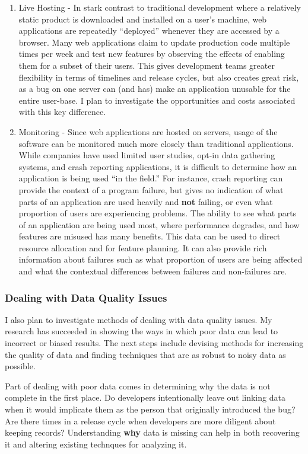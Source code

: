 \documentclass[10pt]{article}
\newcommand\Subsection[1]{\subsubsection*{\small #1}}
\begin{document}
\begin{small}
\begin{enumerate}

\item Live Hosting - 
    In stark contrast to traditional development where a relatively static
    product is downloaded and installed on a user's machine, web applications are repeatedly ``deployed''
    whenever they are accessed by a browser.  Many web applications 
    claim to update production code multiple times per week and 
    test new features by observing the effects of enabling them for a subset of their users. 
    This gives development teams greater flexibility in terms of timelines and release cycles, but
    also creates great risk, as a bug on one server can (and has) make an application unusable
    for the entire user-base.
    I plan to investigate the opportunities and costs associated with this key difference.

\item Monitoring - Since web applications are hosted on servers, usage of the software
    can be monitored much more closely than traditional applications.  While companies have used limited
    user studies, opt-in data gathering systems, and crash reporting applications, it is difficult
    to determine how an application is being used ``in the field.'' For instance, crash reporting
    can provide the context of a program failure, but gives no indication of what parts of an application
    are used heavily and \textbf{not} failing, or even what proportion of users are experiencing problems.
    The ability to see what parts of an application are being used most, where
    performance degrades, and how features are misused has many benefits.  
    This data can be used to direct resource allocation and for
    feature planning.  It can also provide rich information about failures such as what proportion of users 
    are being affected and what the contextual differences between failures and non-failures are.

\end{enumerate}

\Subsection{Dealing with Data Quality Issues}

I also plan to investigate methods of dealing with data quality issues.  My
research has succeeded in showing the ways in which poor data can lead to
incorrect or biased results.  The next steps include devising methods for
increasing the quality of data and finding techniques that are as robust to
noisy data as possible.

Part of dealing with poor data comes in determining why the data is not complete
in the first place.  Do developers intentionally leave out linking data when it would
implicate them as the person that originally introduced the bug?  Are there times
in a release cycle when developers are more diligent about keeping records?  Understanding
\textbf{why} data is missing can help in both recovering it and altering existing technques
for analyzing it.

\vspace{0.5cm}

\end{small}

\begin{footnotesize}

%
%

\end{footnotesize}
\end{document}
